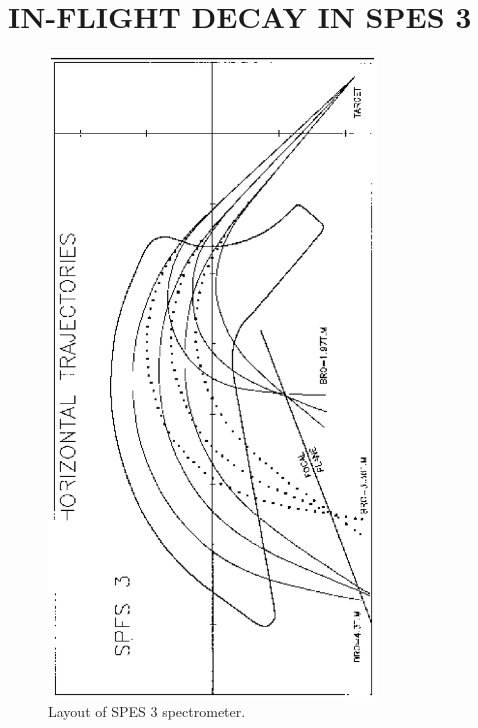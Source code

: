  \clearpage


\section{IN-FLIGHT DECAY IN SPES 3}
\vfill

\begin{figure}[H]
\centerline{\includegraphics[height=17cm,angle=-90]{FigC3-1.eps}}
\caption{\label{figC31}Layout of SPES 3 spectrometer.}
\end{figure}

\vfill
\newpage

